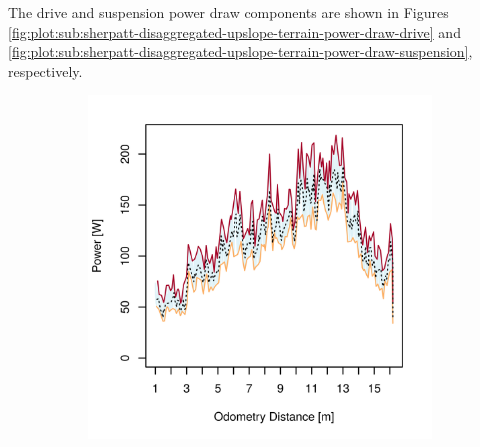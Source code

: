 The drive and suspension power draw components are shown in Figures \ref{fig:plot:sub:sherpatt-disaggregated-upslope-terrain-power-draw-drive} and \ref{fig:plot:sub:sherpatt-disaggregated-upslope-terrain-power-draw-suspension}, respectively.

\begin{figure}[h]
\captionsetup[subfigure]{justification=centering}
\vspace{-2ex}
	\centering
    \setlength{\subfigureWidth}{0.32\textwidth}
    \setlength{\graphicsHeight}{50mm}
    \hypersetup{hidelinks=true}%
	\begin{subfigure}[t]{\subfigureWidth}
        \centering
        \includegraphics[height=\graphicsHeight]{sections/locomotion-power-draws/plots/locomotion-power-draw-on-upslope-terrain.png}
		\label{fig:plot:sub:sherpatt-disaggregated-upslope-terrain-power-draw-locomotion}
	\end{subfigure}\hfill
	\begin{subfigure}[t]{\subfigureWidth}
        \centering

\end{subfigure}
\end{figure}
